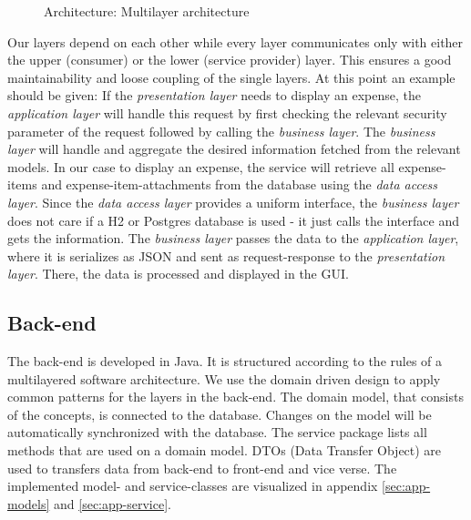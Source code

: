 \begin{figure}[H]
	\centering
	\caption{Architecture: Multilayer architecture}
	\label{fig:architecture-layer}
\end{figure}

Our layers depend on each other while every layer communicates only with either the upper (consumer) or the lower (service provider) layer. This ensures a good maintainability and loose coupling of the single layers.\newline
At this point an example should be given: If the \textit{presentation layer} needs to display an expense, the \textit{application layer} will handle this request by first checking the relevant security parameter of the request followed by calling the \textit{business layer}. The \textit{business layer} will handle and aggregate the desired information fetched from the relevant models. In our case to display an expense, the service will retrieve all expense-items and expense-item-attachments from the database using the \textit{data access layer}. Since the \textit{data access layer} provides a uniform interface, the \textit{business layer} does not care if a H2 or Postgres database is used - it just calls the interface and gets the information. The \textit{business layer} passes the data to the \textit{application layer}, where it is serializes as JSON and sent as request-response to the \textit{presentation layer}. There, the data is processed and displayed in the GUI.

\subsection{Back-end}
The back-end is developed in Java. It is structured according to the rules of a multilayered software architecture. We use the domain driven design \cite{ddd} to apply common patterns for the layers in the back-end. The domain model, that consists of the concepts, is connected to the database. Changes on the model will be automatically synchronized with the database. The service package lists all methods that are used on a domain model.\newline
DTOs (Data Transfer Object) are used to transfers data from back-end to front-end and vice verse. \newline The implemented model- and service-classes are visualized in appendix \ref{sec:app-models} and \ref{sec:app-service}. \par



